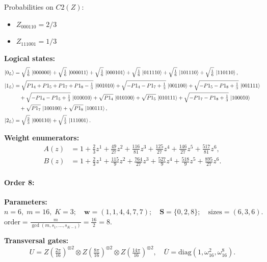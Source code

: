 \documentclass[11pt]{article}
\begin{document}
Probabilities on $C2 (Z)$:
\begin{itemize}
    \item $Z_{000110} = 2/3$
    \item $Z_{111001} = 1/3$
\end{itemize}

\noindent\textbf{Logical states:}
\begin{align*}
\ket{0_L} &= \sqrt{\tfrac{1}{6}}\,\ket{000000} + \sqrt{\tfrac{1}{6}}\,\ket{000011} + \sqrt{\tfrac{1}{6}}\,\ket{000101} + \sqrt{\tfrac{1}{6}}\,\ket{011110} + \sqrt{\tfrac{1}{6}}\,\ket{101110} + \sqrt{\tfrac{1}{6}}\,\ket{110110},
\\[2pt]
\ket{1_L} &= \sqrt{P1_4 + P1_5 + P1_7 + P1_8 - \tfrac{1}{3}}\,\ket{001010} + \sqrt{-P1_4 - P1_7 + \tfrac{1}{3}}\,\ket{001100} + \sqrt{-P1_5 - P1_8 + \tfrac{1}{3}}\,\ket{001111}\\
&\quad + \sqrt{-P1_4 - P1_5 + \tfrac{1}{3}}\,\ket{010010} + \sqrt{P1_4}\,\ket{010100} + \sqrt{P1_5}\,\ket{010111} + \sqrt{-P1_7 - P1_8 + \tfrac{1}{3}}\,\ket{100010}\\
&\quad + \sqrt{P1_7}\,\ket{100100} + \sqrt{P1_8}\,\ket{100111},
\\[2pt]
\ket{2_L} &= \sqrt{\tfrac{2}{3}}\,\ket{000110} + \sqrt{\tfrac{1}{3}}\,\ket{111001}.
\end{align*}

\noindent\textbf{Weight enumerators:}
\begin{align*}
A(z) &= 1 + \tfrac{2}{3}z^{1} + \tfrac{49}{27}z^{2} + \tfrac{116}{81}z^{3} + \tfrac{125}{27}z^{4} + \tfrac{146}{27}z^{5} + \tfrac{517}{81}z^{6},\\[2pt]
B(z) &= 1 + \tfrac{2}{3}z^{1} + \tfrac{115}{9}z^{2} + \tfrac{764}{27}z^{3} + \tfrac{527}{9}z^{4} + \tfrac{518}{9}z^{5} + \tfrac{895}{27}z^{6}.
\end{align*}

\paragraph{\textbf{Order 8:}}
\noindent\textbf{Parameters:} $n=6,\; m=16,\; K=3;\quad \mathbf w=(1, 1, 4, 4, 7, 7);\quad \mathbf S=\{0, 2, 8\};\quad \text{sizes}=\left(6, 3, 6\right).$ $\displaystyle \text{order}=\frac{m}{\gcd(m,s_1,\dots,s_{K-1})}=\frac{16}{2}=8.$

\noindent\textbf{Transversal gates:}
\[
    U=Z \left(\tfrac{2\pi}{16}\right)^{\otimes2} \otimes Z \left(\tfrac{8\pi}{16}\right)^{\otimes2} \otimes Z \left(\tfrac{14\pi}{16}\right)^{\otimes2},\quad
    \overline U=\mathrm{diag}(1,\omega_{16}^{2},\omega_{16}^{8}).
\]
\end{document}

